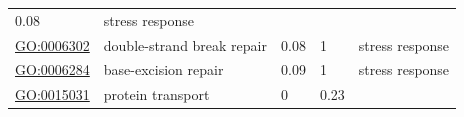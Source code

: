 \documentclass[
]{article}
\begin{document}
\begin{longtable}[]{@{}lllll@{}}
\begin{minipage}[t]{0.17\columnwidth}
0.08\strut
\end{minipage} & \begin{minipage}[t]{0.17\columnwidth}\raggedright
stress response\strut
\end{minipage}\tabularnewline
\begin{minipage}[t]{0.17\columnwidth}\raggedright
\url{GO:0006302}\strut
\end{minipage} & \begin{minipage}[t]{0.17\columnwidth}\raggedright
double-strand break repair\strut
\end{minipage} & \begin{minipage}[t]{0.17\columnwidth}\raggedright
0.08\strut
\end{minipage} & \begin{minipage}[t]{0.17\columnwidth}\raggedright
1\strut
\end{minipage} & \begin{minipage}[t]{0.17\columnwidth}\raggedright
stress response\strut
\end{minipage}\tabularnewline
\begin{minipage}[t]{0.17\columnwidth}\raggedright
\url{GO:0006284}\strut
\end{minipage} & \begin{minipage}[t]{0.17\columnwidth}\raggedright
base-excision repair\strut
\end{minipage} & \begin{minipage}[t]{0.17\columnwidth}\raggedright
0.09\strut
\end{minipage} & \begin{minipage}[t]{0.17\columnwidth}\raggedright
1\strut
\end{minipage} & \begin{minipage}[t]{0.17\columnwidth}\raggedright
stress response\strut
\end{minipage}\tabularnewline
\begin{minipage}[t]{0.17\columnwidth}\raggedright
\url{GO:0015031}\strut
\end{minipage} & \begin{minipage}[t]{0.17\columnwidth}\raggedright
protein transport\strut
\end{minipage} & \begin{minipage}[t]{0.17\columnwidth}\raggedright
0\strut
\end{minipage} & \begin{minipage}[t]{0.17\columnwidth}\raggedright
0.23\strut
\end{minipage} & \begin{minipage}[t]{0.17\columnwidth}\raggedright

\end{minipage}
\end{longtable}
\end{document}
